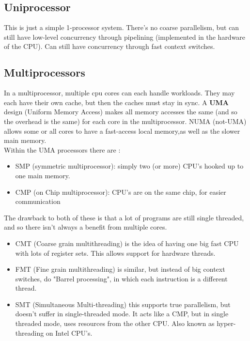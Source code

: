\documentclass[12pt]{article}
\theoremstyle{definition}
\begin{document}
\subsection{Uniprocessor}
This is just a simple 1-processor system. There's no coarse parallelism, but can still have low-level concurrency through pipelining (implemented in the hardware of the CPU). Can still have concurrency through fast context switches.
\\ \linebreak
\subsection{Multiprocessors}
In a multiprocessor, multiple cpu cores can each handle workloads. They may each have their own cache, but then the caches must stay in sync. A \textbf{UMA} design (Uniform Memory Access) makes all memory accesses the same (and so the overhead is the same) for each core in the multiprocessor. NUMA (not-UMA) allows some or all cores to have a fast-access local memory,as well as the slower main memory.
\\ \linebreak
Within the UMA processors there are :

\begin{itemize}
	\item SMP (symmetric multiprocessor): simply two (or more) CPU's hooked up to one main memory.
	\item CMP (on Chip multiprocessor): CPU's are on the same chip, for easier communication
\end{itemize}
The drawback to both of these is that a lot of programs are still single threaded, and so there isn't always a benefit from multiple cores. 

\begin{itemize}
	\item CMT (Coarse grain multithreading) is the idea of having one big fast CPU with lots of register sets. This allows support for hardware threads. 
	\item FMT (Fine grain multithreading) is similar, but instead of big context switches, do "Barrel processing", in which each instruction is a different thread. 
	\item SMT (Simultaneous Multi-threading) this supports true parallelism, but doesn't suffer in single-threaded mode. It acts like a CMP, but in single threaded mode, uses resources from the other CPU. Also known as hyper-threading on Intel CPU's.
\end{itemize}
\end{document}
